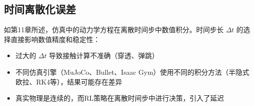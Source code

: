 \subsection{时间离散化误差}

如第11章所述，仿真中的动力学方程在离散时间步中数值积分。时间步长 $\Delta t$ 的选择直接影响数值精度和稳定性：

\begin{itemize}
    \item 过大的 $\Delta t$ 导致接触计算不准确（穿透、弹跳）
    \item 不同仿真引擎（MuJoCo、Bullet、Isaac Gym）使用不同的积分方法（半隐式欧拉、RK4等），结果可能存在差异
    \item 真实物理是连续的，而RL策略在离散时间步中进行决策，引入了延迟
\end{itemize}


